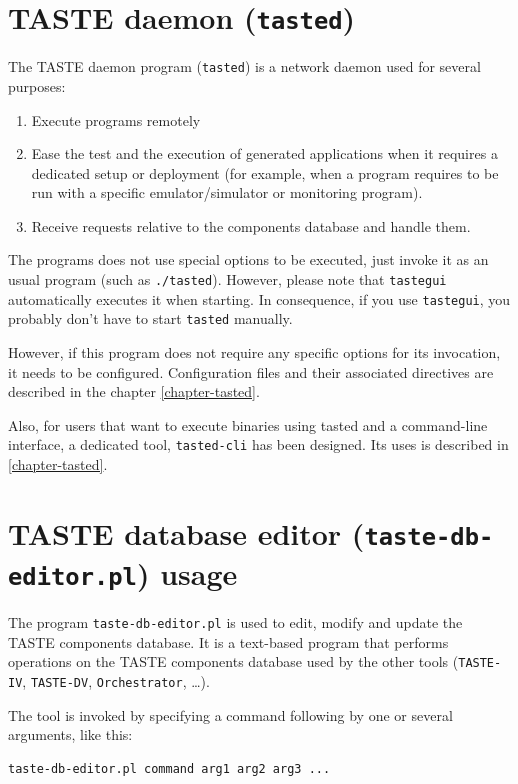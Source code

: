 \documentclass[11pt]{book}
\begin{document}
\section{TASTE daemon (\texttt{tasted})}
The TASTE daemon program (\texttt{tasted}) is a network daemon used for several
purposes:
\begin{enumerate}
   \item
      Execute programs remotely
   \item
      Ease the test and the execution of generated applications when it requires
      a dedicated setup or deployment (for example, when a program requires to
      be run with a specific emulator/simulator or monitoring program).
   \item
      Receive requests relative to the components database and handle them.
\end{enumerate}

The programs does not use special options to be executed, just invoke it as an
usual program (such as \texttt{./tasted}). However, please note that
\texttt{tastegui} automatically executes it when starting. In consequence, if
you use \texttt{tastegui}, you probably don't have to start \texttt{tasted}
manually.

However, if this program does not require any specific options for its
invocation, it needs to be configured. Configuration files and their associated
directives are described in the chapter \ref{chapter-tasted}.

Also, for users that want to execute binaries using tasted and a command-line
interface, a dedicated tool, \texttt{tasted-cli} has been designed. Its uses is
described in \ref{chapter-tasted}.

\section{TASTE database editor (\texttt{taste-db-editor.pl}) usage}
\label{label-db-editor-usage}
The program \texttt{taste-db-editor.pl} is used to edit, modify and update
the TASTE components database. It is a text-based program that performs
operations on the TASTE components database used by the other tools
(\texttt{TASTE-IV}, \texttt{TASTE-DV}, \texttt{Orchestrator}, \ldots).

The tool is invoked by specifying a command following by one or several
arguments, like this:
\begin{verbatim}
taste-db-editor.pl command arg1 arg2 arg3 ...
\end{verbatim}
\end{document}
